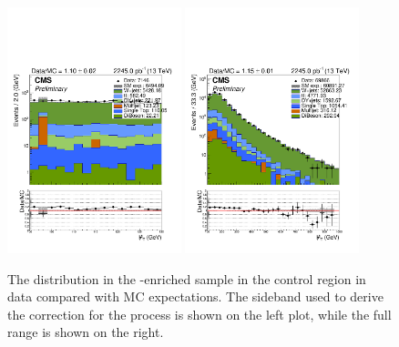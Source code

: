 \begin{figure}[!h]
  \centering
  \includegraphics[width=0.45\textwidth]{figures/sidebandCorr/mhtSideband_NMinusOne_MHT_WJets}
  \includegraphics[width=0.45\textwidth]{figures/sidebandCorr/mht_NMinusOne_MHT_WJets}
  \caption{The \mht distribution in the \wj-enriched sample in the \mj control region in data compared with MC expectations. 
     The \mht sideband used to derive the correction for the \wj process is shown on the left plot, while the full range is shown on the right.}
  \label{fig:wjets_MHTsideband}
\end{figure}

